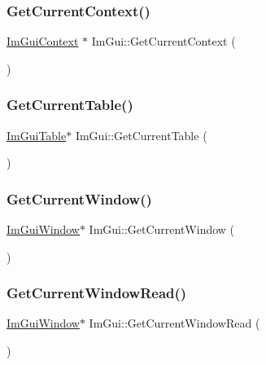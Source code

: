 \subsubsection{\texorpdfstring{Get\+Current\+Context()}{GetCurrentContext()}}
{\footnotesize\ttfamily \hyperlink{structImGuiContext}{Im\+Gui\+Context} $\ast$ Im\+Gui\+::\+Get\+Current\+Context (\begin{DoxyParamCaption}{ }\end{DoxyParamCaption})}

\mbox{\label{namespaceImGui_ab913251bcd59a8631baa04fdc1bc9949}} 
\subsubsection{\texorpdfstring{Get\+Current\+Table()}{GetCurrentTable()}}
{\footnotesize\ttfamily \hyperlink{structImGuiTable}{Im\+Gui\+Table}$\ast$ Im\+Gui\+::\+Get\+Current\+Table (\begin{DoxyParamCaption}{ }\end{DoxyParamCaption})\hspace{0.3cm}{\ttfamily [inline]}}

\mbox{\label{namespaceImGui_a7ceba68eca2b09fb6bf1ad88037e6203}} 
\subsubsection{\texorpdfstring{Get\+Current\+Window()}{GetCurrentWindow()}}
{\footnotesize\ttfamily \hyperlink{structImGuiWindow}{Im\+Gui\+Window}$\ast$ Im\+Gui\+::\+Get\+Current\+Window (\begin{DoxyParamCaption}{ }\end{DoxyParamCaption})\hspace{0.3cm}{\ttfamily [inline]}}

\mbox{\label{namespaceImGui_a408f9ddac92f8629a7e273ced5f8c3aa}} 
\subsubsection{\texorpdfstring{Get\+Current\+Window\+Read()}{GetCurrentWindowRead()}}
{\footnotesize\ttfamily \hyperlink{structImGuiWindow}{Im\+Gui\+Window}$\ast$ Im\+Gui\+::\+Get\+Current\+Window\+Read (\begin{DoxyParamCaption}{ }\end{DoxyParamCaption})\hspace{0.3cm}{\ttfamily [inline]}}

